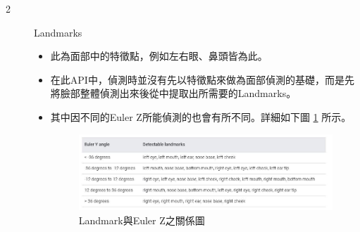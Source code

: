 \documentclass[12pt]{article}  %
\theoremstyle{plain}
\begin{document}
\begin{itemize}
\begin{description}
\item[2] Landmarks
\begin{itemize}
\item 此為面部中的特徵點，例如左右眼、鼻頭皆為此。
\item 在此API中，偵測時並沒有先以特徵點來做為面部偵測的基礎，而是先將臉部整體偵測出來後從中提取出所需要的Landmarks。
\item 其中因不同的Euler Z所能偵測的也會有所不同。詳細如下圖 \ref{Landmark與EulerZ之關係圖} 所示。
\begin{figure}[htbp]
\centering
\includegraphics[width=10cm]{pic/ch3/Landmarks.JPG}
\caption{Landmark與Euler Z之關係圖} \label{Landmark與EulerZ之關係圖}
\end{figure}
\end{itemize}


\end{description}
\end{itemize}
\end{document}
